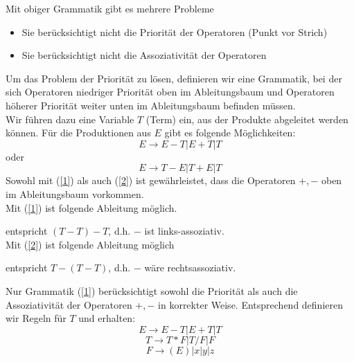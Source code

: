\documentclass[a4paper]{scrartcl}
\begin{document}
Mit obiger Grammatik gibt es mehrere Probleme
\begin{itemize}
\item Sie berücksichtigt nicht die Priorität der Operatoren (Punkt vor Strich)
\item Sie berücksichtigt nicht die Assoziativität der Operatoren
\end{itemize}

Um das Problem der Priorität zu lösen, definieren wir eine Grammatik, bei der sich Operatoren niedriger Priorität oben im Ableitungsbaum und Operatoren höherer Priorität weiter unten im Ableitungsbaum befinden müssen.\\
Wir führen dazu eine Variable $T$ (Term) ein, aus der Produkte abgeleitet werden können. Für die Produktionen aus $E$ gibt es folgende Möglichkeiten:
\begin{equation} \label{1}
E \rightarrow E-T | E+T | T
\end{equation}
oder
\begin{equation}\label{2}
E \rightarrow T -E | T+E | T
\end{equation}
Sowohl mit (\ref{1}) als auch (\ref{2}) ist gewährleistet, dass die Operatoren $+,-$ oben im Ableitungsbaum vorkommen.\\
Mit (\ref{1}) ist folgende Ableitung möglich.

 entspricht $(T-T)-T$, d.h. $-$ ist links-assoziativ.\\
Mit (\ref{2}) ist folgende Ableitung möglich\\
entspricht $T-(T-T)$, d.h. $-$ wäre rechtsassoziativ.

Nur Grammatik (\ref{1}) berücksichtigt sowohl die Priorität als auch die Assoziativität der Operatoren $+,-$ in korrekter Weise. Entsprechend definieren wir Regeln für $T$ und erhalten:
\[ E \rightarrow E-T | E+T | T\]
\[ T \rightarrow T*F | T / F | F\]
\[ F \rightarrow (E) | x |y|z\]
\end{document}
